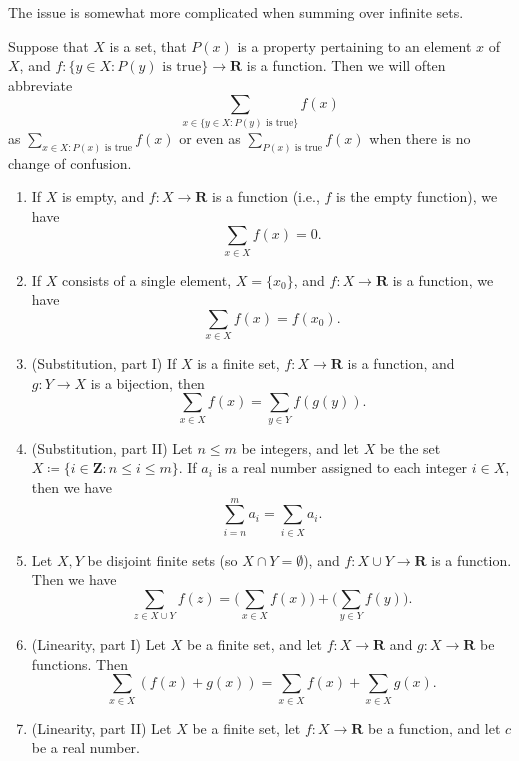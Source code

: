 \begin{remark}\label{7.1.9}
The issue is somewhat more complicated when summing over infinite sets.
\end{remark}

\begin{remark}\label{7.1.10}
Suppose that \(X\) is a set, that \(P(x)\) is a property pertaining to an element \(x\) of \(X\), and \(f : \{y \in X : P(y) \text{ is true}\} \to \mathbf{R}\) is a function.
Then we will often abbreviate
\[
    \sum_{x \in \{y \in X : P(y) \text{ is true}\}} f(x)
\]
as \(\sum_{x \in X : P(x) \text{ is true}} f(x)\) or even as \(\sum_{P(x) \text{ is true}} f(x)\) when there is no change of confusion.
\end{remark}

\begin{proposition}\label{7.1.11}
\mbox{}
    \begin{enumerate}
    \item If \(X\) is empty, and \(f : X \to \mathbf{R}\) is a function (i.e., \(f\) is the empty function), we have
    \[
        \sum_{x \in X} f(x) = 0.
    \]
    \item If \(X\) consists of a single element, \(X = \{x_0\}\), and \(f : X \to \mathbf{R}\) is a function, we have
    \[
        \sum_{x \in X} f(x) = f(x_0).
    \]
    \item (Substitution, part I) If \(X\) is a finite set, \(f : X \to \mathbf{R}\) is a function, and \(g : Y \to X\) is a bijection, then
    \[
        \sum_{x \in X} f(x) = \sum_{y \in Y} f(g(y)).
    \]
    \item (Substitution, part II) Let \(n \leq m\) be integers, and let \(X\) be the set \(X \coloneqq \{i \in \mathbf{Z} : n \leq i \leq m\}\).
    If \(a_i\) is a real number assigned to each integer \(i \in X\), then we have
    \[
        \sum_{i = n}^m a_i = \sum_{i \in X} a_i.
    \]
    \item Let \(X, Y\) be disjoint finite sets (so \(X \cap Y = \emptyset\)), and \(f : X \cup Y \to \mathbf{R}\) is a function.
    Then we have
    \[
        \sum_{z \in X \cup Y} f(z) = \Bigg(\sum_{x \in X} f(x)\Bigg) + \Bigg(\sum_{y \in Y} f(y)\Bigg).
    \]
    \item (Linearity, part I) Let \(X\) be a finite set, and let \(f : X \to \mathbf{R}\) and \(g : X \to \mathbf{R}\) be functions.
    Then
    \[
        \sum_{x \in X} (f(x) + g(x)) = \sum_{x \in X} f(x) + \sum_{x \in X} g(x).
    \]
    \item (Linearity, part II) Let \(X\) be a finite set, let \(f : X \to \mathbf{R}\) be a function, and let \(c\) be a real number.

\end{enumerate}
\end{proposition}
